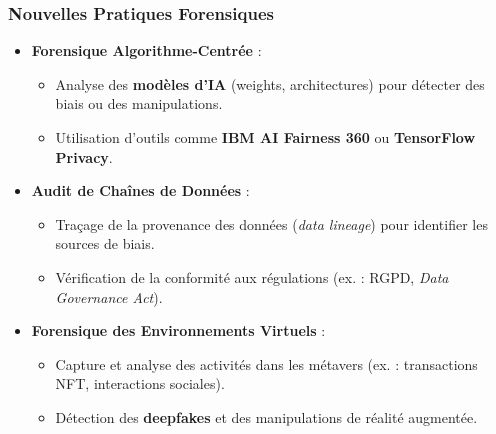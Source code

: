\documentclass[a4paper,12pt]{report}
\begin{document}
	\subsubsection{Nouvelles Pratiques Forensiques}
	\begin{itemize}
		\item \textbf{Forensique Algorithme-Centrée} :
		\begin{itemize}
			\item Analyse des \textbf{modèles d’IA} (weights, architectures) pour détecter des biais ou des manipulations.
			\item Utilisation d’outils comme \textbf{IBM AI Fairness 360} ou \textbf{TensorFlow Privacy}.
		\end{itemize}
		\item \textbf{Audit de Chaînes de Données} :
		\begin{itemize}
			\item Traçage de la provenance des données (\textit{data lineage}) pour identifier les sources de biais.
			\item Vérification de la conformité aux régulations (ex. : RGPD, \textit{Data Governance Act}).
		\end{itemize}
		\item \textbf{Forensique des Environnements Virtuels} :
		\begin{itemize}
			\item Capture et analyse des activités dans les métavers (ex. : transactions NFT, interactions sociales).
			\item Détection des \textbf{deepfakes} et des manipulations de réalité augmentée.
		\end{itemize}
	\end{itemize}
	
\end{document}
